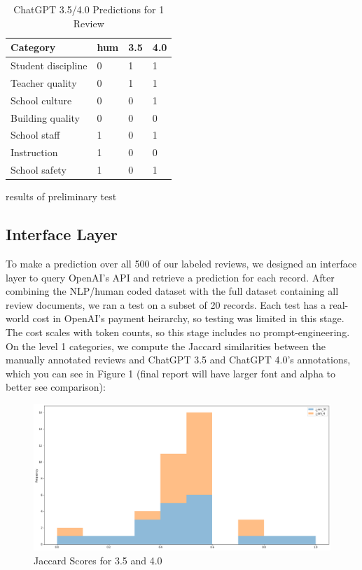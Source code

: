 \documentclass[12pt,a4paper]{article}
\begin{document}
\begin{table}[htb]
    \caption{ChatGPT 3.5/4.0 Predictions for 1 Review\label{tab1}}
    
    \begin{tabular*}{\columnwidth}{@{\extracolsep\fill}llll@{\extracolsep\fill}}
        \toprule
        Category & hum & 3.5 & 4.0 \\
        \midrule
        Student discipline & 0 & 1 & 1 \\
        Teacher quality & 0 & 1 & 1 \\
        School culture & 0 & 0 & 1 \\
        Building quality & 0 & 0 & 0 \\
        School staff & 1 & 0 & 1 \\
        Instruction & 1 & 0 & 0 \\
        School safety & 1 & 0 & 1 \\
        \bottomrule
    \end{tabular*}
    \begin{tablenotes}
        \item *results of preliminary test
    \end{tablenotes}

\end{table}


\subsection{Interface Layer}

\noindent To make a prediction over all 500 of our labeled reviews, we designed an interface layer to query OpenAI's API and retrieve a prediction for each record. After combining the NLP/human coded dataset with the full dataset containing all review documents, we ran a test on a subset of 20 records. Each test has a real-world cost in OpenAI's payment heirarchy, so testing was limited in this stage. The cost scales with token counts, so this stage includes no prompt-engineering. On the level 1 categories, we compute the Jaccard similarities between the manually annotated reviews and ChatGPT 3.5 and ChatGPT 4.0's annotations, which you can see in Figure 1 (final report will have larger font and alpha to better see comparison):

\begin{figure}[H]
    \centering
    \includegraphics[width=1.0\linewidth]{jaccard_similarity_20.png}
    \caption{Jaccard Scores for 3.5 and 4.0}
    \label{fig1:Jaccard Scores for 3.5 and 4.0}
\end{figure}
\end{document}
